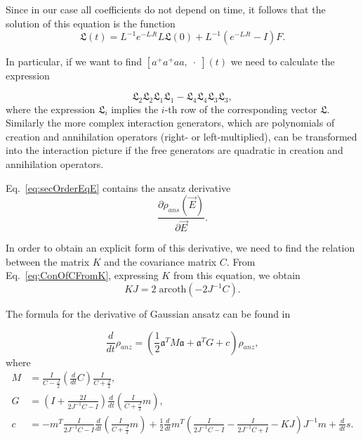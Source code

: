 \documentclass[12pt]{article}
\theoremstyle{definition}
\newcommand\bra{\left<}
\newcommand\ket{\right>}
\newcommand{\braket}[1]{\bra#1\ket}
\newcommand{\mf}[1]{\mathfrak{#1}}
\begin{document}
	Since in our case all coefficients do not depend on time, it follows that the solution of this equation is the function
	\begin{equation}
		\label{eq:SolOfSuper}
		\mathfrak{L}(t) = L^{-1}e^{-LJt}L\mf{L}(0) + L^{-1}(e^{-LJt} - I)F.
	\end{equation}
	
	
	In particular, if we want to find $[a^+a^+aa, \; \cdot \;](t)$ we need to calculate the expression
	
	\begin{equation*}
		\mathfrak{L}_2\mathfrak{L}_2\mathfrak{L}_1\mathfrak{L}_1 - \mathfrak{L}_4\mathfrak{L}_4\mathfrak{L}_3\mathfrak{L}_3,
	\end{equation*}
	where the expression $\mathfrak{L}_i$ implies the $i$-th row of the corresponding vector $\mathfrak{L}$. Similarly the more complex interaction generators, which are polynomials  of creation and annihilation operators (right- or left-multiplied), can be transformed into the interaction picture if the free generators are quadratic in creation and annihilation operators. 
	
	
	
	Eq.~\eqref{eq:secOrderEqE} contains the ansatz derivative
	\begin{equation*}
		 \frac{\partial \rho_{ans}(\vec{E})}{\partial \vec{E}}.
	\end{equation*}
	
	In order to obtain an explicit form of this derivative, we need to find the relation between the matrix $K$ and the covariance matrix $C$. From Eq.~\eqref{eq:ConOfCFromK}, expressing $K$ from this equation, we obtain
	\begin{equation}
		\label{eq:ConOfKFromC}
		KJ = 2\;\text{arcoth}\left(-2J^{-1}C\right).		
	\end{equation}
	
	The formula for the derivative of Gaussian ansatz can be found in \cite{Dis}
	
	\begin{equation}
		\label{eq:DerWithLin}
		\frac{d}{dt}\rho_{anz} = (\frac{1}{2}\mf{a}^TM\mf{a} + \mf{a}^TG + c)\rho_{anz},
	\end{equation}
	where
	\begin{align*}
		M &= \frac{I}{C - \frac{J}{2}}\left(\frac{d}{dt}C\right)\frac{I}{C + \frac{J}{2}},\\
		G &= \left(  I + \frac{2I}{2J^{-1}C - I}  \right)\frac{d}{dt}\left(\frac{I}{C + \frac{J}{2}}m\right),\\
		c &=-m^T\frac{I}{2J^{-1}C -  I}\frac{d}{dt}\left(\frac{I}{C + \frac{J}{2}}m\right) + \frac{1}{2}\frac{d}{dt}m^T\left( \frac{I}{2J^{-1}C - I} - \frac{I}{2J^{-1}C + I} - KJ \right)J^{-1}m + \frac{d}{dt}s.
	\end{align*}
	
\end{document}
